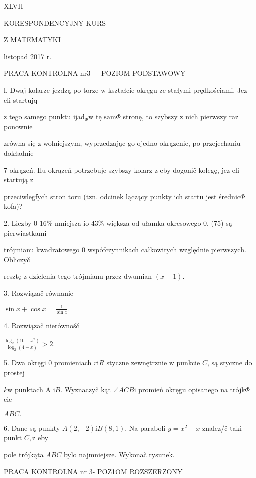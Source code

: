 \documentclass[a4paper,12pt]{article}
\begin{document}
XLVII

KORESPONDENCYJNY KURS

Z MATEMATYKI

listopad 2017 r.

PRACA KONTROLNA $\mathrm{n}\mathrm{r} 3-$ POZIOM PODSTAWOWY

l. Dwaj kolarze jezdzą po torze $\mathrm{w}$ kształcie okręgu ze stałymi prędkościami. $\mathrm{J}\mathrm{e}\dot{\mathrm{z}}$ eli startujq

$\mathrm{z}$ tego samego punktu $\mathrm{i}\mathrm{j}\mathrm{a}\mathrm{d}_{\Phi}\mathrm{w}$ tę $\mathrm{s}\mathrm{a}\mathrm{m}\Phi$ stronę, to szybszy $\mathrm{z}$ nich pierwszy raz ponownie

zrówna się $\mathrm{z}$ wolniejszym, wyprzedzając go ojedno okrązenie, po przejechaniu dokładnie

7 okrązeń. Ilu okrązeń potrzebuje szybszy kolarz $\dot{\mathrm{z}}$ eby dogonič kolegę, $\mathrm{j}\mathrm{e}\dot{\mathrm{z}}$ eli startują $\mathrm{z}$

przeciwlegfych stron toru (tzn. odcinek lączący punkty ich startu jest średnic$\Phi$ kofa)?

2. Liczby $0$ 16\% mniejsza $\mathrm{i}\mathrm{o}$ 43\% większa od ułamka okresowego 0, (75) są pierwiastkami

trójmianu kwadratowego $0$ wspófczynnikach całkowitych względnie pierwszych. Obliczyč

resztę $\mathrm{z}$ dzielenia tego trójmianu przez dwumian $(x-1).$

3. Rozwiązač równanie

$\displaystyle \sin x+\cos x=\frac{1}{\sin x}.$

4. Rozwiązač nierównośč

$\displaystyle \frac{\log_{2}(10-x^{2})}{\log_{2}(4-x)}>2.$

5. Dwa okręgi $0$ promieniach $r\mathrm{i}R$ styczne zewnętrznie $\mathrm{w}$ punkcie $C$, są styczne do prostej

$k\mathrm{w}$ punktach A $\mathrm{i}B$. Wyznaczyč kąt $\angle ACB\mathrm{i}$ promień okręgu opisanego na trójk$\Phi$cie

$ABC.$

6. Dane są punkty $A(2,-2)\mathrm{i}B(8,1)$. Na paraboli $y=x^{2}-x$ znalez/č taki punkt $C, \dot{\mathrm{z}}$ eby

pole trójkąta $ABC$ bylo najmniejsze. Wykonač rysunek.




PRACA KONTROLNA nr 3- POZ1OM ROZSZERZONY
\end{document}
